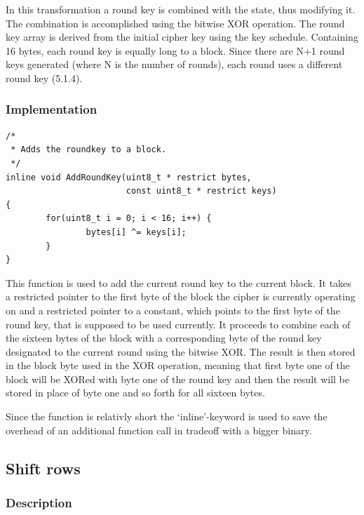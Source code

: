 In this transformation a round key is
combined with the state, thus modifying it. The combination is
accomplished using the bitwise XOR operation. The round key array is
derived from the initial cipher key using the key schedule. Containing
16 bytes, each round key is equally long to a block. Since there are N+1
round keys generated (where N is the number of rounds), each round uses
a different round key (5.1.4).

\hypertarget{implementation-2}{%
\subsubsection{Implementation}\label{implementation-2}}

\begin{lstlisting}
/*
 * Adds the roundkey to a block.
 */
inline void AddRoundKey(uint8_t * restrict bytes, 
                        const uint8_t * restrict keys)
{
        for(uint8_t i = 0; i < 16; i++) {
                bytes[i] ^= keys[i];
        }
}
\end{lstlisting}

This function is used to add the current round key to the current block.
It takes a restricted pointer to the first byte of the block the cipher
is currently operating on and a restricted pointer to a constant, which
points to the first byte of the round key, that is supposed to be used
currently. It proceeds to combine each of the sixteen bytes of the block
with a corresponding byte of the round key designated to the current
round using the bitwise XOR. The result is then stored in the block byte
used in the XOR operation, meaning that first byte one of the block will
be XORed with byte one of the round key and then the result will be
stored in place of byte one and so forth for all sixteen bytes.

Since the function is relativly short the `inline'-keyword is used to
save the overhead of an additional function call in tradeoff with a
bigger binary.

\hypertarget{shift-rows}{%
\subsection{Shift rows}\label{shift-rows}}

\hypertarget{description-3}{%
\subsubsection{Description}\label{description-3}}

